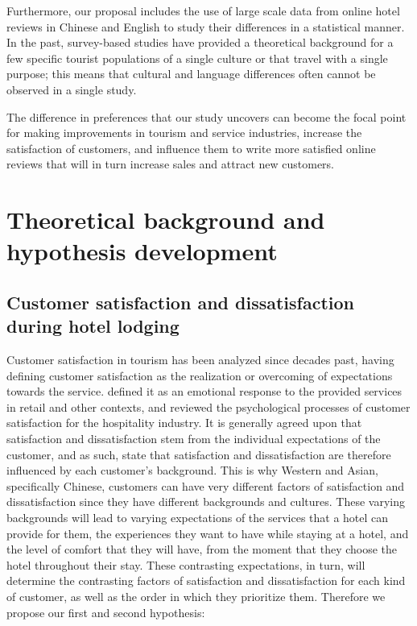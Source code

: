 Furthermore, our proposal includes the use of large scale data from online hotel reviews in Chinese and English to study their differences in a statistical manner. In the past, survey-based studies have provided a theoretical background for a few specific tourist populations of a single culture or that travel with a single purpose; this means that cultural and language differences often cannot be observed in a single study. 

The difference in preferences that our study uncovers can become the focal point for making improvements in tourism and service industries, increase the satisfaction of customers, and influence them to write more satisfied online reviews that will in turn increase sales and attract new customers. 

\section{Theoretical background and hypothesis development}\label{theory_hypothesis}

\subsection{Customer satisfaction and dissatisfaction during hotel lodging}\label{theory_satisfaction}

Customer satisfaction in tourism has been analyzed since decades past, \cite{hunt1975} having defining customer satisfaction as the realization or overcoming of expectations towards the service. \cite{oliver1981} defined it as an emotional response to the provided services in retail and other contexts, and \cite{oh1996} reviewed the psychological processes of customer satisfaction for the hospitality industry. It is generally agreed upon that satisfaction and dissatisfaction stem from the individual expectations of the customer, and as such, \cite{engel1990} state that satisfaction and dissatisfaction are therefore influenced by each customer's background. This is why Western and Asian, specifically Chinese, customers can have very different factors of satisfaction and dissatisfaction since they have different backgrounds and cultures. These varying backgrounds will lead to varying expectations of the services that a hotel can provide for them, the experiences they want to have while staying at a hotel, and the level of comfort that they will have, from the moment that they choose the hotel throughout their stay. These contrasting expectations, in turn, will determine the contrasting factors of satisfaction and dissatisfaction for each kind of customer, as well as the order in which they prioritize them.
Therefore we propose our first and second hypothesis:

